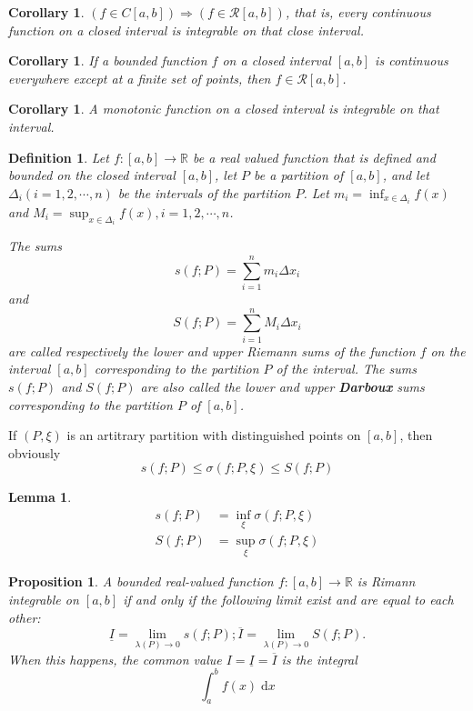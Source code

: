 \documentclass[a4paper,12pt]{article} %
\newtheorem{definition}{Definition}[section]
\newtheorem{proposition}{Proposition}[section]
\newtheorem{lemma}[theorem]{Lemma}
\newtheorem{corollary}[theorem]{Corollary}
\begin{document}
\begin{corollary}
    \normalfont
    $\displaystyle \left(f \in C[a,b]\right) \Rightarrow \left(f \in \mathcal{R}[a,b]\right)$, that is, 
    every continuous function on a closed interval is integrable 
    on that close interval.
\end{corollary}

\begin{corollary}
    \normalfont
    If a bounded function $f$ on a closed interval $[a,b]$ is continuous 
    everywhere except at a finite set of points, then $f \in \mathcal{R}[a,b]$.
\end{corollary}

\begin{corollary}
    \normalfont 
    A monotonic function on a closed interval is integrable on that 
    interval.
\end{corollary}

\begin{definition}
    \normalfont 
    Let $f: [a,b]\to \mathbb{R}$ be a real valued function that is defined 
    and bounded on the closed interval $[a,b]$, let $P$ be a partition of 
    $[a,b]$, and let $\Delta_i(i=1,2,\cdots,n)$ be the intervals of the partition $P$.
    Let $\displaystyle m_i = \inf_{x\in \Delta_i}f(x)$ and
    $\displaystyle M_i = \sup_{x \in \Delta_i} f(x), i=1,2,\cdots,n$.
    
    The sums 
    \[
        s(f;P) = \sum_{i=1}^nm_i\Delta x_i 
        \]
    and 
    \[
        S(f;P) = \sum_{i=1}^nM_i\Delta x_i
        \]
    are called respectively the lower and upper Riemann sums of the function 
    $f$ on the interval $[a,b]$ corresponding to the partition $P$ of the 
    interval.
    The sums $s(f;P)$ and $S(f;P)$ are also called the lower and upper 
    \textbf{Darboux} sums corresponding to the partition $P$ of $[a,b]$.
\end{definition}

If $(P,\xi)$ is an artitrary partition with distinguished points on 
$[a,b]$, then obviously 
\begin{equation}
    s(f;P) \le \sigma(f;P,\xi) \le S(f;P)
\end{equation}

\begin{lemma}
    \[
        \begin{split}
            s(f;P) & = \inf_{\xi}\sigma(f;P,\xi)\\
            S(f;P) & = \sup_{\xi}\sigma(f;P,\xi)
        \end{split}
        \]
\end{lemma}
\begin{proposition}
    \normalfont
    A bounded real-valued function $f:[a,b]\to \mathbb{R}$ is 
    Rimann integrable on $[a,b]$ if and only if the following 
    limit exist and are equal to each other:
    \begin{equation}
        \underline{I} = \lim_{\lambda (P)\to 0}s(f;P); 
        \overline{I} = \lim_{\lambda (P)\to 0}S(f;P).
    \end{equation}
    When this happens, the common value $I = \underline{I} 
    = \overline{I}$ is the integral 
    \[
        \int_a^bf(x)\;\mathrm{d}x
        \]
\end{proposition}
\end{document}
